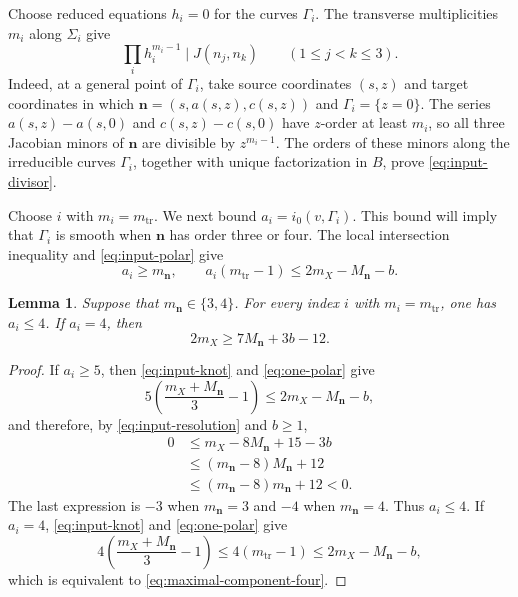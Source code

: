 \documentclass[11pt,letterpaper]{article}
\numberwithin{equation}{section}
\newtheorem{lemma}[lemma]{Lemma}
\theoremstyle{remark}
\theoremstyle{plain}
\begin{document}
Choose reduced equations $h_i=0$ for the curves $\Gamma_i$.  The
transverse multiplicities $m_i$ along $\Sigma_i$ give
\begin{equation}
 \prod_i h_i^{m_i-1}\mid J(n_j,n_k)
 \qquad(1\leq j<k\leq3).                               \label{eq:input-divisor}
\end{equation}
Indeed, at a general point of $\Gamma_i$, take source coordinates
$(s,z)$ and target coordinates in which
$\boldsymbol n=(s,a(s,z),c(s,z))$ and $\Gamma_i=\{z=0\}$.
The series $a(s,z)-a(s,0)$ and $c(s,z)-c(s,0)$ have
$z$-order at least $m_i$, so all three Jacobian minors of
$\boldsymbol n$ are divisible by $z^{m_i-1}$.  The orders of these
minors along the irreducible curves $\Gamma_i$, together with unique
factorization in $B$, prove \eqref{eq:input-divisor}.

Choose $i$ with $m_i=m_{\mathrm{tr}}$.  We next bound
$a_i=i_0(v,\Gamma_i)$.  This bound will imply that $\Gamma_i$ is smooth
when $\boldsymbol n$ has order three or four.  The local intersection
inequality and \eqref{eq:input-polar} give
\begin{equation}
 a_i\geq m_{\boldsymbol{n}},\qquad
 a_i(m_{\mathrm{tr}}-1)
 \leq2m_X-M_{\boldsymbol{n}}-b.                        \label{eq:one-polar}
\end{equation}

\begin{lemma}
\label{lem:maximal-component-estimate}
Suppose that $m_{\boldsymbol{n}}\in\{3,4\}$.  For every index $i$ with
$m_i=m_{\mathrm{tr}}$, one has $a_i\leq4$.  If $a_i=4$, then
\begin{equation}
 2m_X\geq7M_{\boldsymbol{n}}+3b-12.                    \label{eq:maximal-component-four}
\end{equation}
\end{lemma}

\begin{proof}
If $a_i\geq5$, then \eqref{eq:input-knot} and \eqref{eq:one-polar} give
\[
 5\left(\frac{m_X+M_{\boldsymbol{n}}}{3}-1\right)
 \leq2m_X-M_{\boldsymbol{n}}-b,
\]
and therefore, by \eqref{eq:input-resolution} and $b\geq1$,
\[
 \begin{aligned}
 0&\leq m_X-8M_{\boldsymbol n}+15-3b\\
  &\leq(m_{\boldsymbol n}-8)M_{\boldsymbol n}+12\\
  &\leq(m_{\boldsymbol n}-8)m_{\boldsymbol n}+12<0.
 \end{aligned}
\]
The last expression is $-3$ when $m_{\boldsymbol n}=3$ and $-4$
when $m_{\boldsymbol n}=4$.
Thus $a_i\leq4$. If $a_i=4$, \eqref{eq:input-knot} and
\eqref{eq:one-polar} give
\[
 4\left(\frac{m_X+M_{\boldsymbol{n}}}{3}-1\right)
 \leq4(m_{\mathrm{tr}}-1)
 \leq2m_X-M_{\boldsymbol{n}}-b,
\]
which is equivalent to \eqref{eq:maximal-component-four}.
\end{proof}
\end{document}

